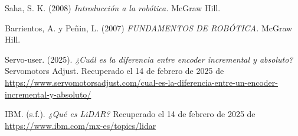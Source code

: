 \begin{thebibliography}{99}
	Saha, S. K. (2008)
	\textit{Introducción a la robótica.} McGraw Hill.
	
	Barrientos, A. y Peñin, L. (2007) 
	\textit{FUNDAMENTOS DE ROBÓTICA.} McGraw Hill.
	
	Servo-user. (2025). 
	\textit{¿Cuál es la diferencia entre encoder incremental y absoluto?}Servomotors Adjust. Recuperado el 14 de febrero de 2025 de \url{https://www.servomotorsadjust.com/cual-es-la-diferencia-entre-un-encoder-incremental-y-absoluto/}

	IBM. (s.f.). 
	\textit{¿Qué es LiDAR?}  Recuperado el 14 de febrero de 2025 de \url{https://www.ibm.com/mx-es/topics/lidar}
	
	
\end{thebibliography}

